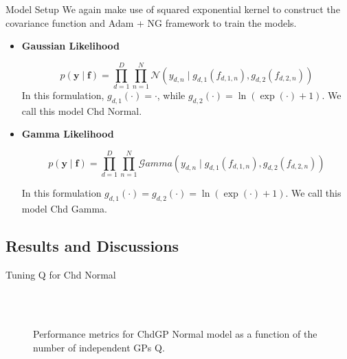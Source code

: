 \begin{frame}{Model Setup}
	We again make use of squared exponential kernel to construct the covariance function and Adam + NG framework to train the models.
	
	\begin{itemize} 
	
	\item \textbf{Gaussian Likelihood}
	
	\begin{equation*}
		p(\mathbf{y} \mid \mathbf{f}) = \prod_{d=1}^{D} \prod_{n=1}^{N} \mathcal{N}\left(y_{d,n} \mid g_{d,1}(f_{d,1,n}), g_{d,2}(f_{d,2,n}) \right)
	\end{equation*}
	In this formulation, \(g_{d,1}(\cdot) = \cdot\), while \(g_{d,2}(\cdot) = \ln(\exp(\cdot) + 1)\). We call this model Chd Normal.
	
	\item \textbf{Gamma Likelihood}
	
	\begin{equation*}
		p(\mathbf{y} \mid \mathbf{f}) = \prod_{d=1}^{D} \prod_{n=1}^{N} \mathcal{G}amma\left( y_{d,n} \mid g_{d,1}(f_{d,1,n}), g_{d,2}(f_{d,2,n}) \right)
	\end{equation*}
	
	In this formulation \(g_{d,1}(\cdot) = g_{d,2}(\cdot) = \ln(\exp(\cdot) + 1)\). We call this model Chd Gamma.
	\end{itemize}
	
		
\end{frame}

\subsection{Results and Discussions}

\begin{frame}{Tuning Q for Chd Normal}
	\begin{figure}[htbp]
		\centering
		\setlength{} 
		\setlength{}
		\subfloat[CRPS]{}
		\subfloat[MSE]{}\\
		\vspace{-0.2cm}
		\subfloat[MSLL]{}
		\subfloat[NLPD]{}\\
		\vspace{-0.5cm}
		\caption{Performance metrics for ChdGP Normal model as a function of the number of independent GPs Q.}
	\end{figure}
\end{frame}

